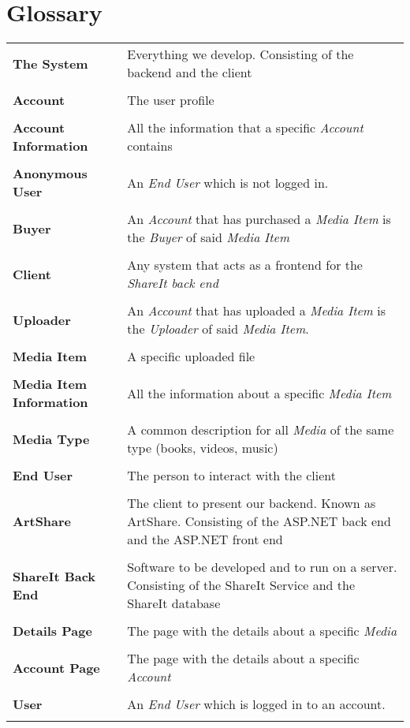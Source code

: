 \documentclass[../report.tex]{subfiles}
\begin{document}
\section{Glossary}
\begin{tabular}{l p{10 cm}}
\textbf{The System} & Everything we develop. Consisting of the backend and the client \\ \\
\textbf{Account} & The user profile \\ \\
\textbf{Account Information} & All the information  that a specific \textit{Account} contains\\ \\
\textbf{Anonymous User} & An \textit{End User} which is not logged in.\\ \\
\textbf{Buyer} & An \textit{Account} that has purchased a \textit{Media Item} is the \textit{Buyer} of said \textit{Media Item} \\ \\
\textbf{Client} & Any system that acts as a frontend for the \textit{ShareIt back end} \\ \\
\textbf{Uploader} & An \textit{Account} that has uploaded a \textit{Media Item} is the \textit{Uploader} of said \textit{Media Item}. \\ \\ %
\textbf{Media Item} & A specific uploaded file \\ \\
\textbf{Media Item Information} & All the information  about a specific \textit{Media Item} \\ \\
\textbf{Media Type} & A common description for all \textit{Media} of the same type (books, videos, music) \\ \\
\textbf{End User} & The person to interact with the client \\ \\
\textbf{ArtShare} & The client to present our backend. Known as ArtShare. Consisting of the ASP.NET back end and the ASP.NET front end \\ \\
\textbf{ShareIt Back End} & Software to be developed and to run on a server. Consisting of the ShareIt Service and the ShareIt database \\ \\
\textbf{Details Page} & The page with the details about a specific \textit{Media} \\ \\
\textbf{Account Page} & The page with the details about a specific \textit{Account} \\ \\
\textbf{User} & An \textit{End User} which is logged in to an account.\\ \\
\end{tabular}
\end{document}
